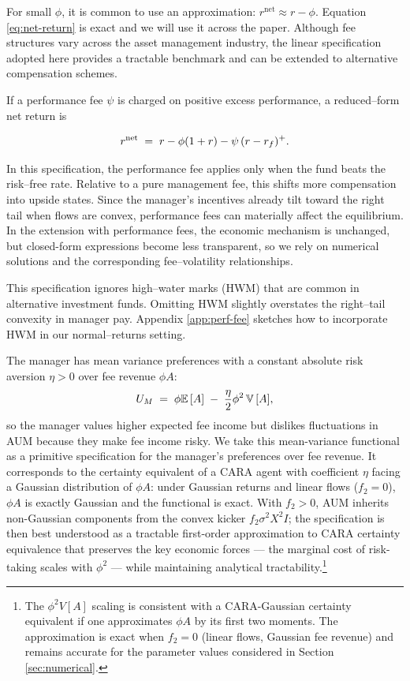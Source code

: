 For small \(\phi\), it is common to use an approximation:
\(r^{\text{net}}\approx r-\phi\). Equation \eqref{eq:net-return} is
exact and we will use it across the paper. Although fee structures vary
across the asset management industry, the linear specification adopted
here provides a tractable benchmark and can be extended to alternative
compensation schemes.

If a performance fee \(\psi\) is charged on positive excess performance,
a reduced--form net return is

\[
r^{\text{net}} \;=\; r - \phi(1+r) - \psi\,(r-r_f)^+.
\]

In this specification, the performance fee applies only when the fund
beats the risk--free rate. Relative to a pure management fee, this
shifts more compensation into upside states. Since the manager's
incentives already tilt toward the right tail when flows are convex,
performance fees can materially affect the equilibrium. In the extension
with performance fees, the economic mechanism is unchanged, but
closed-form expressions become less transparent, so we rely on numerical
solutions and the corresponding fee--volatility relationships.

This specification ignores high--water marks (HWM) that are common in
alternative investment funds. Omitting HWM slightly overstates the
right--tail convexity in manager pay. Appendix \ref{app:perf-fee}
sketches how to incorporate HWM in our normal--returns setting.

The manager has mean variance preferences with a constant absolute risk
aversion \(\eta>0\) over fee revenue \(\phi A\): \begin{equation}
    U_M \;=\; \phi{\mathbb{E}}\,[ A] \;-\; \frac{\eta}{2}\phi^2\,{\mathbb{V}}\,[A],
\end{equation} so the manager values higher expected fee income but
dislikes fluctuations in AUM because they make fee income risky. We take
this mean-variance functional as a primitive specification for the
manager's preferences over fee revenue. It corresponds to the certainty
equivalent of a CARA agent with coefficient \(\eta\) facing a Gaussian
distribution of \(\phi A\): under Gaussian returns and linear flows
(\(f_2=0\)), \(\phi A\) is exactly Gaussian and the functional is exact.
With \(f_2>0\), AUM inherits non-Gaussian components from the convex
kicker \(f_2\sigma^2 X^2 I\); the specification is then best understood
as a tractable first-order approximation to CARA certainty equivalence
that preserves the key economic forces --- the marginal cost of
risk-taking scales with \(\phi^2\) --- while maintaining analytical
tractability.\footnote{The \(\phi^2 V[A]\) scaling is consistent with a
  CARA-Gaussian certainty equivalent if one approximates \(\phi A\) by
  its first two moments. The approximation is exact when \(f_2=0\)
  (linear flows, Gaussian fee revenue) and remains accurate for the
  parameter values considered in Section \ref{sec:numerical}.}

